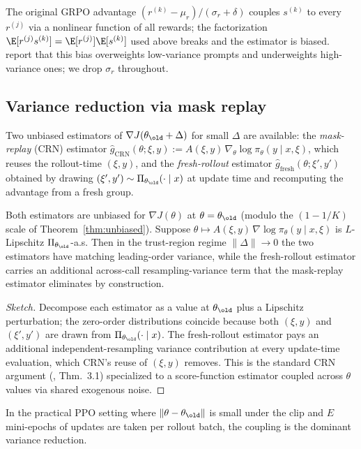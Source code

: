 \begin{remark}
\label{rem:sigma}
The original GRPO advantage
$(r^{(k)} - \mu_r)/(\sigma_r + \delta)$ couples $s^{(k)}$ to every
$r^{(j)}$ via a nonlinear function of all rewards; the factorization
$\E[r^{(j)} s^{(k)}] = \E[r^{(j)}]\E[s^{(k)}]$ used above breaks and
the estimator is biased.  \citet{liu2024drgrpo} report that this bias
overweights low-variance prompts and underweights high-variance ones;
we drop $\sigma_r$ throughout.
\end{remark}

\subsection{Variance reduction via mask replay}
\label{sec:theory-crn}

Two unbiased estimators of $\nabla J(\theta_\old + \Delta)$ for small
$\Delta$ are available: the \emph{mask-replay} (CRN) estimator
$\hat g_{\mathrm{CRN}}(\theta;\xi,y) := A(\xi,y)\,\nabla_\theta \log \pi_\theta(y \mid x, \xi)$,
which reuses the rollout-time $(\xi, y)$, and the \emph{fresh-rollout}
estimator $\hat g_{\mathrm{fresh}}(\theta;\xi',y')$ obtained by
drawing $(\xi', y') \sim \Pi_{\theta_\old}(\cdot \mid x)$ at update
time and recomputing the advantage from a fresh group.

\begin{proposition}
\label{prop:crn}
Both estimators are unbiased for $\nabla J(\theta)$ at
$\theta = \theta_\old$ (modulo the $(1 - 1/K)$ scale of
Theorem~\ref{thm:unbiased}).  Suppose
$\theta \mapsto A(\xi, y)\,\nabla \log \pi_\theta(y \mid x, \xi)$ is
$L$-Lipschitz $\Pi_{\theta_\old}$-a.s.  Then in the trust-region
regime $\|\Delta\| \to 0$ the two estimators have matching leading-order
variance, while the fresh-rollout estimator carries an additional
across-call resampling-variance term that the mask-replay estimator
eliminates by construction.
\end{proposition}

\begin{proof}[Sketch]
Decompose each estimator as a value at $\theta_\old$ plus a Lipschitz
perturbation; the zero-order distributions coincide because both
$(\xi, y)$ and $(\xi', y')$ are drawn from
$\Pi_{\theta_\old}(\cdot \mid x)$.  The fresh-rollout estimator pays
an additional independent-resampling variance contribution at every
update-time evaluation, which CRN's reuse of $(\xi, y)$ removes.  This
is the standard CRN argument
(\citealp{glasserman1992crn}, Thm.~3.1) specialized to a score-function
estimator coupled across $\theta$ values via shared exogenous noise.
\end{proof}

In the practical PPO setting where $\|\theta - \theta_\old\|$ is small
under the clip and $E$ mini-epochs of updates are taken per rollout
batch, the coupling is the dominant variance reduction.
